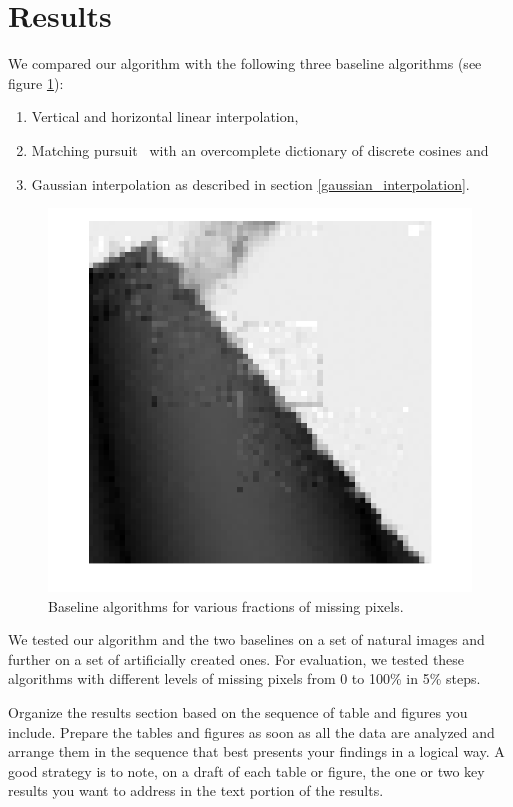 \documentclass[10pt,conference,compsocconf]{IEEEtran}
\begin{document}
\section{Results}
We compared our algorithm with the following three baseline algorithms (see figure \ref{baseline_algorithms}):
\begin{enumerate}
\item Vertical and horizontal linear interpolation,
\item Matching pursuit~\cite{matchingpursuit93} with an overcomplete dictionary of discrete cosines and
\item Gaussian interpolation as described in section \ref{gaussian_interpolation}.
\end{enumerate}

\begin{figure}
\centering
\includegraphics[width=\columnwidth]{images/framing_artifacts.png}
\caption{Baseline algorithms for various fractions of missing pixels.}
\label{baseline_algorithms}
\end{figure}
 
We tested our algorithm and the two baselines on a set of natural images and further on a set of artificially created ones. 
For evaluation, we tested these algorithms with different levels of missing pixels from 0 to 100\% in 5\% steps.

  
Organize the results section based on the sequence of table and
figures you include. Prepare the tables and figures as soon as all
the data are analyzed and arrange them in the sequence that best
presents your findings in a logical way. A good strategy is to note,
on a draft of each table or figure, the one or two key results you
want to address in the text portion of the results.
\end{document}
